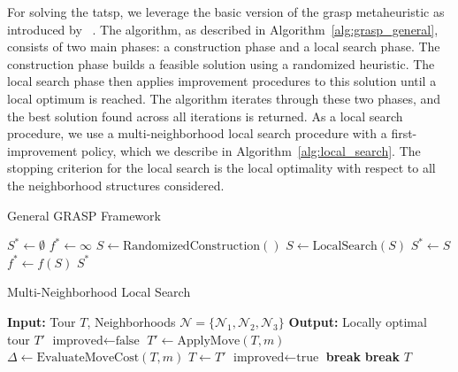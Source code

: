 \documentclass[twocolumn, switch]{article} %
\begin{document}
For solving the \gls{tatsp}, we leverage the basic version of the \gls{grasp} metaheuristic as introduced by ~\cite{Feo1995}. 
The algorithm, as described in Algorithm~\ref{alg:grasp_general}, consists of two main phases: a construction phase and a local search phase.
The construction phase builds a feasible solution using a randomized heuristic. The local search phase then applies improvement procedures to this solution until a local optimum is reached.
The algorithm iterates through these two phases, and the best solution found across all iterations is returned.
As a local search procedure, we use a multi-neighborhood local search procedure with a first-improvement policy, which we describe in Algorithm~\ref{alg:local_search}.
The stopping criterion for the local search is the local optimality with respect to all the neighborhood structures considered.

\begin{algorithm}
\caption{General GRASP Framework}
\label{alg:grasp_general}
\begin{algorithmic}[1]
\State $S^* \leftarrow \emptyset$ 
\State $f^* \leftarrow \infty$ 
    \State $S \leftarrow \text{RandomizedConstruction}()$
    \State $S \leftarrow \text{LocalSearch}(S)$
        \State $S^* \leftarrow S$
        \State $f^* \leftarrow f(S)$
    \EndIf
\EndFor
\State \Return $S^*$
\end{algorithmic}
\end{algorithm}


\begin{algorithm}
\caption{Multi-Neighborhood Local Search}
\label{alg:local_search}
\begin{algorithmic}[1]
\State \textbf{Input:} Tour $T$, Neighborhoods $\mathcal{N} = \{\mathcal{N}_1, \mathcal{N}_2, \mathcal{N}_3\}$
\State \textbf{Output:} Locally optimal tour $T'$
\Repeat
    \State $\text{improved} \leftarrow \text{false}$
            \State $T' \leftarrow \text{ApplyMove}(T, m)$
            \State $\Delta \leftarrow \text{EvaluateMoveCost}(T, m)$ 
                \State $T \leftarrow T'$
                \State $\text{improved} \leftarrow \text{true}$
                \State \textbf{break} 
            \EndIf
        \EndFor
            \State \textbf{break} 
        \EndIf
    \EndFor
{}
\State \Return $T$
\end{algorithmic}
\end{algorithm}
\end{document}
